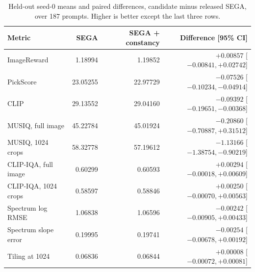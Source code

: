 \begin{table}[ht]
\centering\small
\caption{Held-out seed-0 means and paired differences, candidate minus released SEGA, over 187 prompts. Higher is better except the last three rows.}
\label{tab:heldout-current}
\begin{tabular}{@{}lrrr@{}}
\toprule
Metric & SEGA & SEGA + constancy & Difference [95\% CI]\\
\midrule
ImageReward & 1.18994 & 1.19852 & $+0.00857$ [$ -0.00841, +0.02742 $]\\
PickScore & 23.05255 & 22.97729 & $-0.07526$ [$ -0.10234, -0.04914 $]\\
CLIP & 29.13552 & 29.04160 & $-0.09392$ [$ -0.19651, -0.00368 $]\\
MUSIQ, full image & 45.22784 & 45.01924 & $-0.20860$ [$ -0.70887, +0.31512 $]\\
MUSIQ, 1024 crops & 58.32778 & 57.19612 & $-1.13166$ [$ -1.38754, -0.90219 $]\\
CLIP-IQA, full image & 0.60299 & 0.60593 & $+0.00294$ [$ -0.00018, +0.00609 $]\\
CLIP-IQA, 1024 crops & 0.58597 & 0.58846 & $+0.00250$ [$ -0.00070, +0.00563 $]\\
Spectrum log RMSE & 1.06838 & 1.06596 & $-0.00242$ [$ -0.00905, +0.00433 $]\\
Spectrum slope error & 0.19995 & 0.19741 & $-0.00254$ [$ -0.00678, +0.00192 $]\\
Tiling at 1024 & 0.06836 & 0.06844 & $+0.00008$ [$ -0.00072, +0.00081 $]\\
\bottomrule
\end{tabular}
\end{table}
